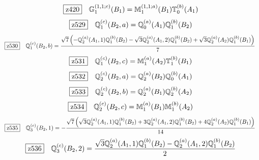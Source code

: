 \documentclass[fleqn,10pt,landscape]{jsarticle}
\begin{document}
\begin{dmath*}
\hspace*{3mm}\fbox{z420}\quad \mathbb{G}_{1}^{(1,1;c)}(B_{1})=\mathbb{M}_{1}^{(1,1;a)}(B_{1}) \mathbb{T}_{0}^{(b)}(A_{1})
\end{dmath*}
\begin{dmath*}
\hspace*{3mm}\fbox{z529}\quad \mathbb{Q}_{1}^{(c)}(B_{2},a)=\mathbb{Q}_{0}^{(a)}(A_{1}) \mathbb{Q}_{1}^{(b)}(B_{2})
\end{dmath*}
\begin{dmath*}
\hspace*{3mm}\fbox{z530}\quad \mathbb{Q}_{1}^{(c)}(B_{2},b)=\frac{\sqrt{7} \left(- \mathbb{Q}_{2}^{(a)}(A_{1},1) \mathbb{Q}_{1}^{(b)}(B_{2}) - \sqrt{3} \mathbb{Q}_{2}^{(a)}(A_{1},2) \mathbb{Q}_{1}^{(b)}(B_{2}) + \sqrt{3} \mathbb{Q}_{2}^{(a)}(A_{2}) \mathbb{Q}_{1}^{(b)}(B_{1})\right)}{7}
\end{dmath*}
\begin{dmath*}
\hspace*{3mm}\fbox{z531}\quad \mathbb{Q}_{1}^{(c)}(B_{2},c)=\mathbb{M}_{1}^{(a)}(A_{2}) \mathbb{T}_{1}^{(b)}(B_{1})
\end{dmath*}
\begin{dmath*}
\hspace*{3mm}\fbox{z532}\quad \mathbb{Q}_{2}^{(c)}(B_{2},a)=\mathbb{Q}_{2}^{(a)}(B_{2}) \mathbb{Q}_{0}^{(b)}(A_{1})
\end{dmath*}
\begin{dmath*}
\hspace*{3mm}\fbox{z533}\quad \mathbb{Q}_{2}^{(c)}(B_{2},b)=\mathbb{Q}_{2}^{(a)}(B_{1}) \mathbb{Q}_{2}^{(b)}(A_{2})
\end{dmath*}
\begin{dmath*}
\hspace*{3mm}\fbox{z534}\quad \mathbb{Q}_{2}^{(c)}(B_{2},c)=\mathbb{M}_{1}^{(a)}(B_{1}) \mathbb{M}_{1}^{(b)}(A_{2})
\end{dmath*}
\begin{dmath*}
\hspace*{3mm}\fbox{z535}\quad \mathbb{Q}_{3}^{(c)}(B_{2},1)=- \frac{\sqrt{7} \left(\sqrt{3} \mathbb{Q}_{2}^{(a)}(A_{1},1) \mathbb{Q}_{1}^{(b)}(B_{2}) + 3 \mathbb{Q}_{2}^{(a)}(A_{1},2) \mathbb{Q}_{1}^{(b)}(B_{2}) + 4 \mathbb{Q}_{2}^{(a)}(A_{2}) \mathbb{Q}_{1}^{(b)}(B_{1})\right)}{14}
\end{dmath*}
\begin{dmath*}
\hspace*{3mm}\fbox{z536}\quad \mathbb{Q}_{3}^{(c)}(B_{2},2)=\frac{\sqrt{3} \mathbb{Q}_{2}^{(a)}(A_{1},1) \mathbb{Q}_{1}^{(b)}(B_{2}) - \mathbb{Q}_{2}^{(a)}(A_{1},2) \mathbb{Q}_{1}^{(b)}(B_{2})}{2}
\end{dmath*}
\end{document}

